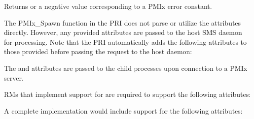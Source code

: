Returns  or a negative value corresponding to a PMIx error constant.

\priattr
The PMIx_Spawn function in the \ac{PRI} does not parse or utilize the attributes directly. However, any provided attributes are passed to the host \ac{SMS} daemon for processing. Note that the \ac{PRI} automatically adds the following attributes to those provided before passing the request to the host daemon:


The  and  attributes are passed to the child processes upon connection to a PMIx server.

\reqattr
\acp{RM} that implement support for  are required to support the following attributes:


\optattr
A complete implementation would include support for the following attributes:


\descr

